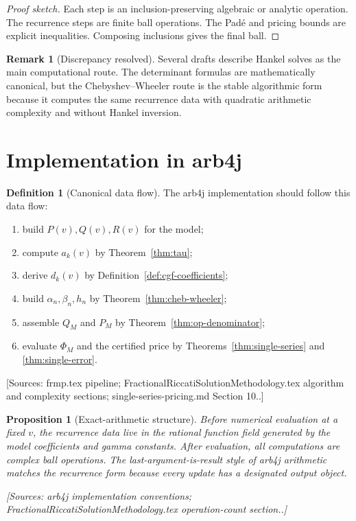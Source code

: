 \documentclass[11pt]{article}
\newtheorem{proposition}[theorem]{Proposition}
\theoremstyle{definition}
\newtheorem{definition}[theorem]{Definition}
\newtheorem{remark}[theorem]{Remark}
\newcommand{\Source}[1]{\par\smallskip\noindent\textup{[Sources: #1.]}}
\begin{document}
\begin{proof}[Proof sketch]
Each step is an inclusion-preserving algebraic or analytic operation.
The recurrence steps are finite ball operations.
The Padé and pricing bounds are explicit inequalities.
Composing inclusions gives the final ball.
\end{proof}

\begin{remark}[Discrepancy resolved]
Several drafts describe Hankel solves as the main computational route.
The determinant formulas are mathematically canonical,
but the Chebyshev--Wheeler route is the stable algorithmic form because it computes the same recurrence data with quadratic arithmetic complexity and without Hankel inversion.
\end{remark}

\section{Implementation in arb4j}

\begin{definition}[Canonical data flow]\label{def:arb4j-flow}
The arb4j implementation should follow this data flow:
\begin{enumerate}[label=(\arabic*)]
\item build $P(v),Q(v),R(v)$ for the model;
\item compute $a_k(v)$ by Theorem~\ref{thm:tau};
\item derive $d_k(v)$ by Definition~\ref{def:cgf-coefficients};
\item build $\alpha_n,\beta_n,h_n$ by Theorem~\ref{thm:cheb-wheeler};
\item assemble $Q_M$ and $P_M$ by Theorem~\ref{thm:op-denominator};
\item evaluate $\Phi_M$ and the certified price by Theorems~\ref{thm:single-series} and \ref{thm:single-error}.
\end{enumerate}
\Source{frmp.tex pipeline; FractionalRiccatiSolutionMethodology.tex algorithm and complexity sections; single-series-pricing.md Section 10.}
\end{definition}

\begin{proposition}[Exact-arithmetic structure]\label{prop:exact-structure}
Before numerical evaluation at a fixed $v$,
the recurrence data live in the rational function field generated by the model coefficients and gamma constants.
After evaluation,
all computations are complex ball operations.
The last-argument-is-result style of arb4j arithmetic matches the recurrence form because every update has a designated output object.
\Source{arb4j implementation conventions; FractionalRiccatiSolutionMethodology.tex operation-count section.}
\end{proposition}
\end{document}
